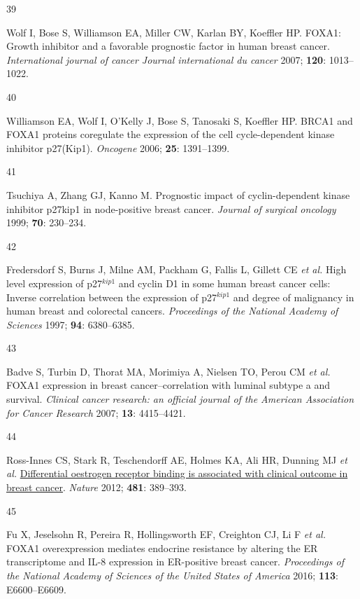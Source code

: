\documentclass[
  11pt,
]{article}
\newlength{\cslhangindent}
\newlength{\csllabelwidth}
\newlength{\cslentryspacingunit} %
\newenvironment{CSLReferences}[2] %
 {%
  \setlength{\parindent}{0pt}
  \ifodd #1
  \let\oldpar\par
  \def\par{\hangindent=\cslhangindent\oldpar}
  \fi
  \setlength{\parskip}{#2\cslentryspacingunit}
 }%
 {}
\newcommand{\CSLLeftMargin}[1]{\parbox[t]{\csllabelwidth}{#1}}
\newcommand{\CSLRightInline}[1]{\parbox[t]{\linewidth - \csllabelwidth}{#1}\break}
\begin{document}
\begin{CSLReferences}{0}{0}
\leavevmode{}%
\CSLLeftMargin{39 }%
\CSLRightInline{Wolf I, Bose S, Williamson EA, Miller CW, Karlan BY, Koeffler HP. {FOXA1}: Growth inhibitor and a favorable prognostic factor in human breast cancer. \emph{International journal of cancer Journal international du cancer} 2007; \textbf{120}: 1013--1022.}

\leavevmode{}%
\CSLLeftMargin{40 }%
\CSLRightInline{Williamson EA, Wolf I, O'Kelly J, Bose S, Tanosaki S, Koeffler HP. {BRCA1} and {FOXA1} proteins coregulate the expression of the cell cycle-dependent kinase inhibitor p27(Kip1). \emph{Oncogene} 2006; \textbf{25}: 1391--1399.}

\leavevmode{}%
\CSLLeftMargin{41 }%
\CSLRightInline{Tsuchiya A, Zhang GJ, Kanno M. Prognostic impact of cyclin-dependent kinase inhibitor p27kip1 in node-positive breast cancer. \emph{Journal of surgical oncology} 1999; \textbf{70}: 230--234.}

\leavevmode{}%
\CSLLeftMargin{42 }%
\CSLRightInline{Fredersdorf S, Burns J, Milne AM, Packham G, Fallis L, Gillett CE \emph{et al.} High level expression of p27\(^{kip1}\) and cyclin {D1} in some human breast cancer cells: Inverse correlation between the expression of p27\(^{kip1}\) and degree of malignancy in human breast and colorectal cancers. \emph{Proceedings of the National Academy of Sciences} 1997; \textbf{94}: 6380--6385.}

\leavevmode{}%
\CSLLeftMargin{43 }%
\CSLRightInline{Badve S, Turbin D, Thorat MA, Morimiya A, Nielsen TO, Perou CM \emph{et al.} {FOXA1} expression in breast cancer--correlation with luminal subtype a and survival. \emph{Clinical cancer research: an official journal of the American Association for Cancer Research} 2007; \textbf{13}: 4415--4421.}

\leavevmode{}%
\CSLLeftMargin{44 }%
\CSLRightInline{Ross-Innes CS, Stark R, Teschendorff AE, Holmes KA, Ali HR, Dunning MJ \emph{et al.} \href{https://doi.org/10.1038/nature10730}{Differential oestrogen receptor binding is associated with clinical outcome in breast cancer}. \emph{Nature} 2012; \textbf{481}: 389--393.}

\leavevmode{}%
\CSLLeftMargin{45 }%
\CSLRightInline{Fu X, Jeselsohn R, Pereira R, Hollingsworth EF, Creighton CJ, Li F \emph{et al.} {FOXA1} overexpression mediates endocrine resistance by altering the {ER} transcriptome and {IL-8} expression in {ER-positive} breast cancer. \emph{Proceedings of the National Academy of Sciences of the United States of America} 2016; \textbf{113}: E6600--E6609.}


\end{CSLReferences}
\end{document}
